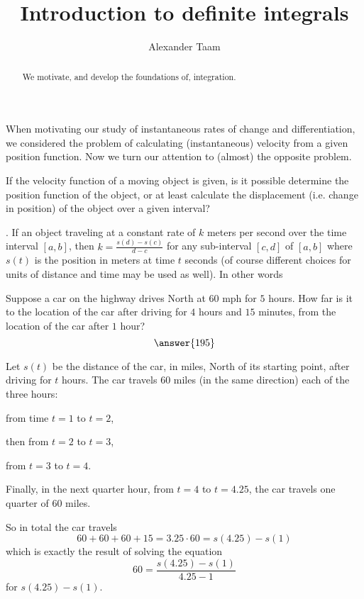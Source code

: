 \documentclass{ximera}
\title{Introduction to definite integrals}
\author{Alexander Taam}
\begin{document}
\begin{abstract}
  We motivate, and develop the foundations of, integration.
\end{abstract}
\maketitle

When motivating our study of instantaneous rates of change and differentiation, we considered the problem of calculating (instantaneous) velocity from a given position function. Now we turn our attention to (almost) the opposite problem. \begin{question}If the velocity function of a moving object is given, is it possible determine the position function of the object, or at least calculate the displacement (i.e. change in position) of the object over a given interval?
\end{question}

\begin{fact}
\begin{foldable}
. If an object traveling at a constant rate of $k$ meters per second over the time interval $[a,b]$, then $k=\frac{s(d)-s(c)}{d-c}$ for any sub-interval $[c,d]$ of $[a,b]$ where $s(t)$ is the position in meters at time $t$ seconds (of course different choices for units of distance and time may be used as well). In other words
\end{foldable}
\end{fact}

\begin{example}
Suppose a car on the highway drives North at $60$ mph for $5$ hours. How far is it to the location of the car after driving for $4$ hours and $15$ minutes, from the location of the car after $1$ hour? \[\answer{195}\]

\begin{feedback} Let $s(t)$ be the distance of the car, in miles, North of its starting point, after driving for $t$ hours. The car travels $60$ miles (in the same direction) each of the three hours: 

from time $t=1$ to $t=2$, 

then from $t=2$ to $t=3$, 

from $t=3$ to $t=4$. 

Finally, in the next quarter hour, from $t=4$ to $t=4.25$, the car travels one quarter of $60$ miles. 

So in total the car travels \[60+60+60+15=3.25\cdot60=s(4.25)-s(1)\] which is exactly the result of solving the equation \[60=\frac{s(4.25)-s(1)}{4.25-1}\] for $s(4.25)-s(1)$.
\end{feedback}
\end{example}
\end{document}

